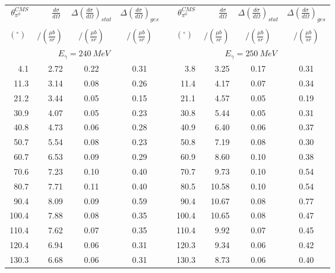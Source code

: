 \begin{table}[htbp] 
\begin{center} 
\begin{tabular}{|r|r|c|c|l|r|r|c|c|} 

\cline{1-4}
\cline{6-9} 
$\theta_{\pi^0}^{CMS}$ & 
$\displaystyle\frac{d\sigma}{d\Omega}\;$ & 
${\Delta}\left( \frac{d\sigma}{d\Omega}\right)_{stat}$ & 
${\Delta}\left( \frac{d\sigma}{d\Omega}\right)_{ges}$ & & 
$\theta_{\pi^0}^{CMS}$ & 
$\displaystyle\frac{d\sigma}{d\Omega}\;$ & 
${\Delta}\left( \frac{d\sigma}{d\Omega}\right)_{stat}$ & 
${\Delta}\left( \frac{d\sigma}{d\Omega}\right)_{ges}$ \\ 
& & & & & & & &\\ 
 $(^{\circ})\;$ & $/(\frac{{\mu}b}{sr})$ & $/(\frac{{\mu}b}{sr})$ & $/(\frac{{\mu}b}{sr})$ & & $(^{\circ})\;$ & $/(\frac{{\mu}b}{sr})$ & $/(\frac{{\mu}b}{sr})$ & $/(\frac{{\mu}b}{sr})$ \\ 
\cline{1-4} 
\cline{6-9} 
\multicolumn{4}{|c|}{ $E_{\gamma}=240~MeV$} & & 
\multicolumn{4}{c|}{ $E_{\gamma}=250~MeV$} \\ 
\cline{1-4} 
\cline{6-9} 
  4.1 &  2.72 &  0.22 &  0.31 & &   3.8 &  3.25 &  0.17 &  0.31 \\ 
 11.3 &  3.14 &  0.08 &  0.26 & &  11.4 &  4.17 &  0.07 &  0.34 \\ 
 21.2 &  3.44 &  0.05 &  0.15 & &  21.1 &  4.57 &  0.05 &  0.19 \\ 
 30.9 &  4.07 &  0.05 &  0.23 & &  30.8 &  5.44 &  0.05 &  0.31 \\ 
 40.8 &  4.73 &  0.06 &  0.28 & &  40.9 &  6.40 &  0.06 &  0.37 \\ 
 50.7 &  5.54 &  0.08 &  0.23 & &  50.8 &  7.19 &  0.08 &  0.30 \\ 
 60.7 &  6.53 &  0.09 &  0.29 & &  60.9 &  8.60 &  0.10 &  0.38 \\ 
 70.6 &  7.23 &  0.10 &  0.40 & &  70.7 &  9.73 &  0.10 &  0.54 \\ 
 80.7 &  7.71 &  0.11 &  0.40 & &  80.5 & 10.58 &  0.10 &  0.54 \\ 
 90.4 &  8.09 &  0.09 &  0.59 & &  90.4 & 10.67 &  0.08 &  0.77 \\ 
100.4 &  7.88 &  0.08 &  0.35 & & 100.4 & 10.65 &  0.08 &  0.47 \\ 
110.4 &  7.62 &  0.07 &  0.35 & & 110.4 &  9.92 &  0.07 &  0.45 \\ 
120.4 &  6.94 &  0.06 &  0.31 & & 120.3 &  9.34 &  0.06 &  0.42 \\ 
130.3 &  6.68 &  0.06 &  0.31 & & 130.3 &  8.73 &  0.06 &  0.40 \\ 

\end{tabular}
\end{center}
\end{table}
